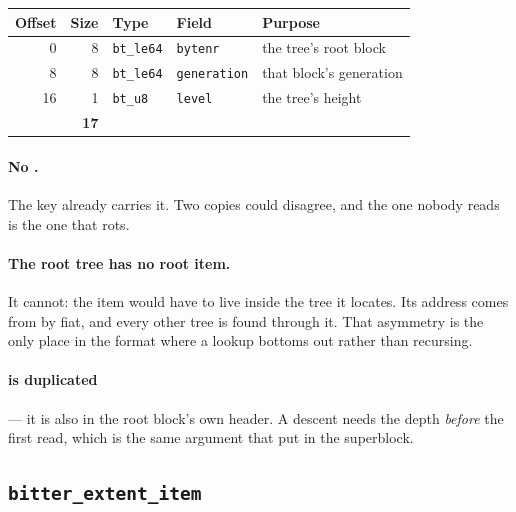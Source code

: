 \begin{center}
\begin{tabular}{rrllp{6cm}}
  \toprule
  Offset & Size & Type & Field & Purpose \\
  \midrule
  0  & 8 & \texttt{bt\_le64} & \texttt{bytenr}     & the tree's root block \\
  8  & 8 & \texttt{bt\_le64} & \texttt{generation} & that block's generation \\
  16 & 1 & \texttt{bt\_u8}   & \texttt{level}      & the tree's height \\
  \midrule
  \multicolumn{2}{r}{\textbf{17}} & & & \\
  \bottomrule
\end{tabular}
\end{center}

\paragraph{No .} The key already carries it. Two copies could
disagree, and the one nobody reads is the one that rots.

\paragraph{The root tree has no root item.} It cannot: the item would have to
live inside the tree it locates. Its address comes from  by
fiat, and every other tree is found through it. That asymmetry is the only
place in the format where a lookup bottoms out rather than recursing.

\paragraph{ is duplicated} --- it is also in the root block's own
header. A descent needs the depth \emph{before} the first read, which is the
same argument that put  in the superblock.


\subsection{\texttt{bitter\_extent\_item}}

